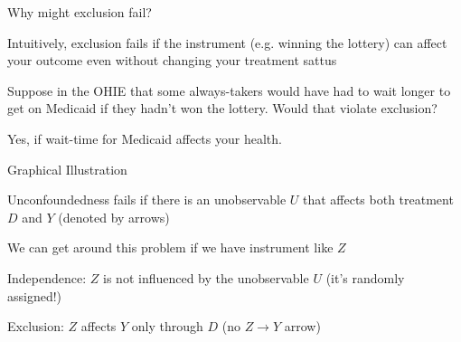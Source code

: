 \documentclass[11pt,english,handout]{beamer}
\newenvironment{wideitemize}{\itemize\addtolength{\itemsep}{10pt}}{\enditemize}
\begin{document}
\begin{frame}{Why might exclusion fail?}
	
\begin{wideitemize}
	\item
	Intuitively, exclusion fails if the instrument (e.g. winning the lottery) can affect your outcome even without changing your treatment sattus
	
	\pause
	\item
	Suppose in the OHIE that some always-takers would have had to wait longer to get on Medicaid if they hadn't won the lottery. Would that violate exclusion? 
	
	\pause
	\item
	Yes, if wait-time for Medicaid affects your health. 
	 
\end{wideitemize}	
\end{frame}



\begin{frame}{Graphical Illustration}
	
	
\begin{wideitemize}
	\item
	Unconfoundedness fails if there is an unobservable $U$ that affects both treatment $D$ and $Y$ (denoted by arrows)
	
	\pause
	\item
	We can get around this problem if we have instrument like $Z$
	
	\pause
	\item
	Independence: $Z$ is not influenced by the unobservable $U$ (it's randomly assigned!)
	
	\pause
	\item
	Exclusion: $Z$ affects $Y$ only through $D$ (no $Z \rightarrow Y$ arrow)
\end{wideitemize}	
\end{frame}
\end{document}
